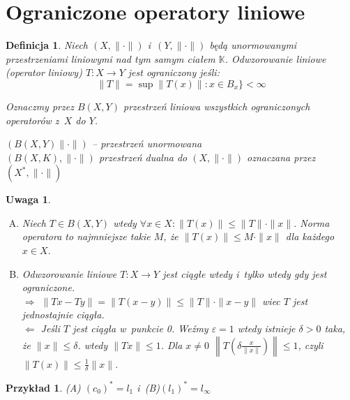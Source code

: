 \documentclass[11pt]{mwrep}
\renewcommand{\[}{\begin{equation}}
\renewcommand{\]}{\end{equation}}
\newcommand{\K}{\ensuremath{\mathbb{K}}}
\newcommand{\norm}{\|\cdot\|}
\newtheorem{uw}[subsection]{Uwaga}
\newtheorem{de}[subsection]{Definicja}
\newtheorem{ex}[subsection]{Przykład}
\newcounter{numer}
\begin{document}
\section{Ograniczone operatory liniowe}
\begin{de}
Niech $(X,\norm)$ i~$(Y,\norm)$ będą unormowanymi przestrzeniami liniowymi nad tym samym ciałem \K.
Odwzorowanie liniowe (operator liniowy) $T\colon X \to Y$ jest ograniczony jeśli:
$$\| T\| = \sup \|T(x)\|\colon x \in B_x\} < \infty$$

Oznaczmy przez $B(X,Y)$ przestrzeń liniowa wszystkich ograniczonych operatorów z~$X$ do $Y$.

$(B(X,Y) \norm)$ -- przestrzeń unormowana \\
$(B(X,K), \norm)$ przestrzeń dualna do $(X,\norm)$ oznaczana przez $(X^*,\norm)$
\end{de}
\begin{uw}
	\begin{enumerate}[(A)]
		\item Niech $T\in B(X,Y)$ wtedy $\forall x\in X: \|T(x)\| \le \|T\| \cdot \|x\|$. 
			Norma operatora to najmniejsze takie $M$, że $\|T(x)\| \le M \cdot \|x\|$ dla każdego $x\in X$.
		\item Odwzorowanie liniowe $T\colon X \to Y$ jest ciągłe wtedy i~tylko wtedy gdy jest ograniczone.\\
			$\Rightarrow$ $\|Tx-Ty\| = \|T(x-y)\| \le \|T\| \cdot \|x - y\|$ wiec $T$ jest jednostajnie ciągła.\\
			$\Leftarrow$ Jeśli $T$ jest ciągła w~punkcie 0. Weźmy $\varepsilon=1$ wtedy istnieje $\delta>0$ taka, że $\|x\|\le \delta$.
			wtedy $\|Tx\|\le 1$.
			Dla $x\not =  0$ $\left\|T\left( \delta \frac{x}{\|x\|} \right)\right\|\le 1$, czyli $\|T(x)\|\le \frac{1}{\delta}\|x\|$.

	\end{enumerate}
\end{uw}
\begin{ex}	
	\textup{(A)} $(c_0)^* = l_1$ i~\textup{(B)}$(l_1)^* = l_\infty$
\end{ex}
\end{document}
